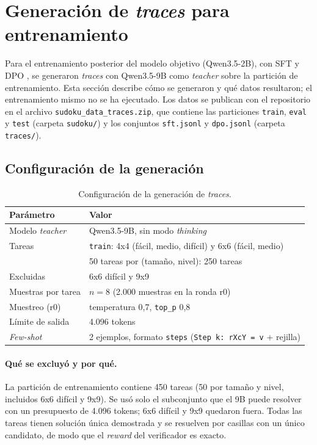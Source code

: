 \section{Generación de \emph{traces} para entrenamiento}
\label{sec:traces}

Para el entrenamiento posterior del modelo objetivo (Qwen3.5-2B), con SFT
\citep{chu2025sft} y DPO \citep{rafailov2023dpo}, se generaron
\emph{traces} con Qwen3.5-9B como \emph{teacher} sobre la partición de
entrenamiento. Esta sección describe cómo se generaron y qué datos resultaron;
el entrenamiento mismo no se ha ejecutado. Los datos se publican con el
repositorio en el archivo \texttt{sudoku\_data\_traces.zip}, que contiene las
particiones \texttt{train}, \texttt{eval} y \texttt{test} (carpeta
\texttt{sudoku/}) y los conjuntos \texttt{sft.jsonl} y \texttt{dpo.jsonl}
(carpeta \texttt{traces/}).

\subsection{Configuración de la generación}
\label{sec:traces-config}

\begin{table}[htbp]
  \centering\small
  \caption{Configuración de la generación de \emph{traces}.}
  \label{tab:traces-config}
  \begin{tabular}{@{}ll@{}}
    \toprule
    Parámetro & Valor \\
    \midrule
    Modelo \emph{teacher} & Qwen3.5-9B, sin modo \emph{thinking} \\
    Tareas & \texttt{train}: 4x4 (fácil, medio, difícil) y 6x6 (fácil, medio) \\
    & 50 tareas por (tamaño, nivel): 250 tareas \\
    Excluidas & 6x6 difícil y 9x9 \\
    Muestras por tarea & $n = 8$ (2.000 muestras en la ronda r0) \\
    Muestreo (r0) & temperatura 0,7, \texttt{top\_p} 0,8 \\
    Límite de salida & 4.096 tokens \\
    \emph{Few-shot} & 2 ejemplos, formato \texttt{steps} (\texttt{Step k: rXcY = v} + rejilla) \\
    \bottomrule
  \end{tabular}
\end{table}

\paragraph{Qué se excluyó y por qué.} La partición de entrenamiento contiene 450
tareas (50 por tamaño y nivel, incluidos 6x6 difícil y 9x9). Se usó solo el
subconjunto que el 9B puede resolver con un presupuesto de 4.096 tokens;
6x6 difícil y 9x9 quedaron fuera. Todas las tareas tienen solución única
demostrada y se resuelven por casillas con un único candidato, de modo que el
\emph{reward} del verificador es exacto.

